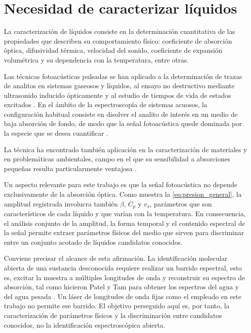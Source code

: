 \section{Necesidad de caracterizar líquidos}
\label{sec:necesidad_caracterizacion}

La caracterización de líquidos consiste en la determinación
cuantitativa de las propiedades que describen su comportamiento
físico: coeficiente de absorción óptica, difusividad térmica,
velocidad del sonido, coeficiente de expansión volumétrica y su
dependencia con la temperatura, entre otras.

Las técnicas fotoacústicas pulsadas se han aplicado a la
determinación de trazas de analitos en sistemas gaseosos y
líquidos, al ensayo no destructivo mediante ultrasonido inducido
ópticamente y al estudio de tiempos de vida de estados excitados
\cite{Quan1994}. En el ámbito de la espectroscopía de sistemas
acuosos, la configuración habitual consiste en disolver el analito
de interés en un medio de baja absorción de fondo, de modo que la
señal fotoacústica quede dominada por la especie que se desea
cuantificar \cite{Quan1994}.

La técnica ha encontrado también aplicación en la caracterización
de materiales y en problemáticas ambientales, campo en el que su
sensibilidad a absorciones pequeñas resulta particularmente
ventajosa \cite{Marin2008,Tam1986}.

Un aspecto relevante para este trabajo es que la señal fotoacústica
no depende exclusivamente de la absorción óptica. Como muestra la
\cref{eq:presion_general}, la amplitud registrada involucra también
$\beta$, $C_p$ y $v_s$, parámetros que son característicos de cada
líquido y que varían con la temperatura. En consecuencia, el
análisis conjunto de la amplitud, la forma temporal y el contenido
espectral de la señal permite extraer parámetros físicos del medio
que sirven para discriminar entre un conjunto acotado de líquidos
candidatos conocidos.

Conviene precisar el alcance de esta afirmación. La identificación
molecular abierta de una sustancia desconocida requiere realizar un
barrido espectral, esto es, excitar la muestra a múltiples
longitudes de onda y reconstruir su espectro de absorción, tal como
hicieron Patel y Tam para obtener los espectros del agua y del agua
pesada \cite{PatelTam1981}. Un láser de longitudes de onda fijas
como el empleado en este trabajo no permite ese barrido. El objetivo
perseguido aquí es, por tanto, la caracterización de parámetros
físicos y la discriminación entre candidatos conocidos, no la
identificación espectroscópica abierta.

